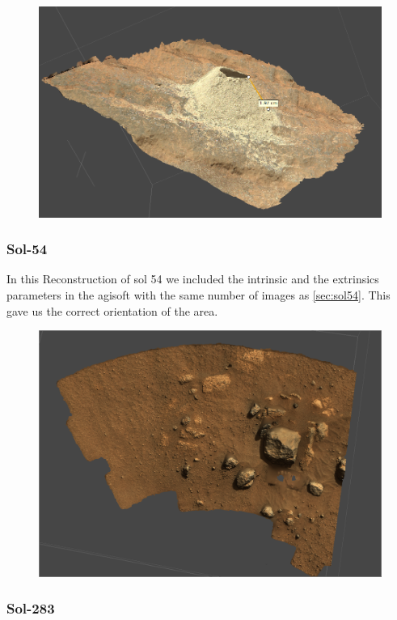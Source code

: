 \begin{figure}[H]
	\centering
	\includegraphics[scale=0.3]{img/drill.png}
	\label{fig:sol268calib}
	\caption{}
\end{figure}
\subsubsection{Sol-54}

In this Reconstruction of sol 54 we included the intrinsic and the extrinsics parameters in the agisoft with the same number of images as \ref{sec:sol54}. This gave us the correct orientation of the area.


\begin{figure}[H]
	\centering
	\includegraphics[scale=0.3]{img/sol54calib.png}
	\label{fig:sol54calib}
	\caption{}
\end{figure}

\subsubsection{Sol-283}

